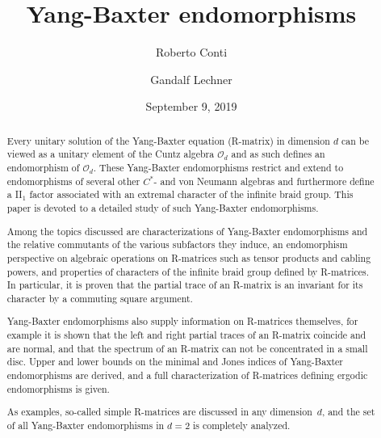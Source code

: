 \documentclass[12pt,a4paper]{amsart}
\numberwithin{equation}{section}
\theoremstyle{remark}
\newcommand{\CO}[0]{\mathcal{O}} \newcommand{\CP}[0]{\mathcal{P}}
\begin{document}
 \vspace*{-7mm}
\title[Yang-Baxter endomorphisms]{Yang-Baxter endomorphisms}

\author[R.~Conti]{Roberto Conti}
\address[RC]{Dipartimento SBAI
\\ Sapienza Universit\`{a} di Roma \\ Italy}

\author[G.~Lechner]{Gandalf Lechner}
\address[GL]{ School of Mathematics\\ Cardiff University  \\ UK}



\begin{abstract}
    Every unitary solution of the Yang-Baxter equation (R-matrix) in dimension $d$ can be viewed as a unitary element of the Cuntz algebra $\CO_d$ and as such defines an endomorphism of $\CO_d$. These Yang-Baxter endomorphisms restrict and extend to endomorphisms of several other $C^*$- and von Neumann algebras and furthermore define a II$_1$ factor associated with an extremal character of the infinite braid group. This paper is devoted to a detailed study of such Yang-Baxter endomorphisms.
    
    Among the topics discussed are characterizations of Yang-Baxter endomorphisms and the relative commutants of the various subfactors they induce, an endomorphism perspective on algebraic operations on R-matrices such as tensor products and cabling powers, and properties of characters of the infinite braid group defined by R-matrices. In particular, it is proven that the partial trace of an R-matrix is an invariant for its character by a commuting square argument.
    
    Yang-Baxter endomorphisms also supply information on R-matrices themselves, for example it is shown that the left and right partial traces of an R-matrix coincide and are normal, and that the spectrum of an R-matrix can not be concentrated in a small disc. Upper and lower bounds on the minimal and Jones indices of Yang-Baxter endomorphisms are derived, and a full characterization of R-matrices defining ergodic endomorphisms is given.
    
    As examples, so-called simple R-matrices are discussed in any dimension~$d$, and the set of all Yang-Baxter endomorphisms in $d=2$ is completely analyzed.
\end{abstract}

\date{September 9, 2019}
\maketitle
\end{document}
